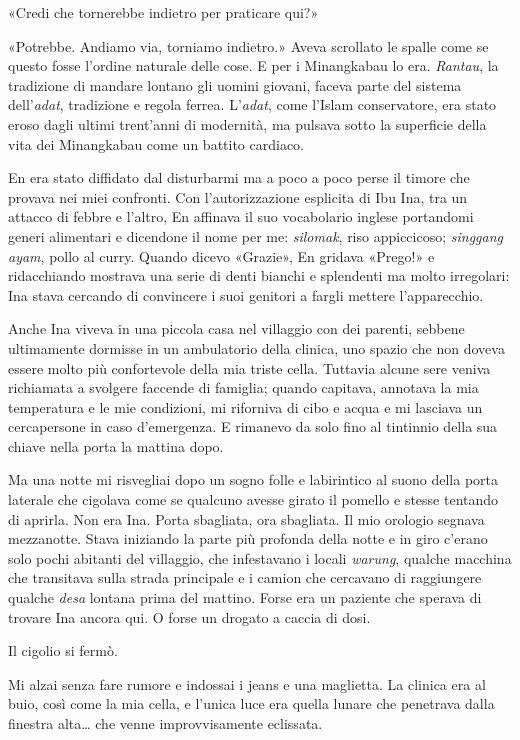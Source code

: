 «Credi che tornerebbe indietro per praticare qui?»

«Potrebbe. Andiamo via, torniamo indietro.» Aveva scrollato le spalle
come se questo fosse l'ordine naturale delle cose. E per i Minangkabau
lo era. \emph{Rantau}, la tradizione di mandare lontano gli uomini
giovani, faceva parte del sistema dell'\emph{adat}, tradizione e regola
ferrea. L'\emph{adat}, come l'Islam conservatore, era stato eroso dagli
ultimi trent'anni di modernità, ma pulsava sotto la superficie della
vita dei Minangkabau come un battito cardiaco.

En era stato diffidato dal disturbarmi ma a poco a poco perse il timore
che provava nei miei confronti. Con l'autorizzazione esplicita di Ibu
Ina, tra un attacco di febbre e l'altro, En affinava il suo vocabolario
inglese portandomi generi alimentari e dicendone il nome per me:
\emph{silomak}, riso appiccicoso; \emph{singgang ayam}, pollo al curry.
Quando dicevo «Grazie», En gridava «Prego!» e ridacchiando mostrava una
serie di denti bianchi e splendenti ma molto irregolari: Ina stava
cercando di convincere i suoi genitori a fargli mettere l'apparecchio.

Anche Ina viveva in una piccola casa nel villaggio con dei parenti,
sebbene ultimamente dormisse in un ambulatorio della clinica, uno spazio
che non doveva essere molto più confortevole della mia triste cella.
Tuttavia alcune sere veniva richiamata a svolgere faccende di famiglia;
quando capitava, annotava la mia temperatura e le mie condizioni, mi
riforniva di cibo e acqua e mi lasciava un cercapersone in caso
d'emergenza. E rimanevo da solo fino al tintinnio della sua chiave nella
porta la mattina dopo.

Ma una notte mi risvegliai dopo un sogno folle e labirintico al suono
della porta laterale che cigolava come se qualcuno avesse girato il
pomello e stesse tentando di aprirla. Non era Ina. Porta sbagliata, ora
sbagliata. Il mio orologio segnava mezzanotte. Stava iniziando la parte
più profonda della notte e in giro c'erano solo pochi abitanti del
villaggio, che infestavano i locali \emph{warung}, qualche macchina che
transitava sulla strada principale e i camion che cercavano di
raggiungere qualche \emph{desa} lontana prima del mattino. Forse era un
paziente che sperava di trovare Ina ancora qui. O forse un drogato a
caccia di dosi.

Il cigolio si fermò.

Mi alzai senza fare rumore e indossai i jeans e una maglietta. La
clinica era al buio, così come la mia cella, e l'unica luce era quella
lunare che penetrava dalla finestra alta\ldots{} che venne
improvvisamente eclissata.

